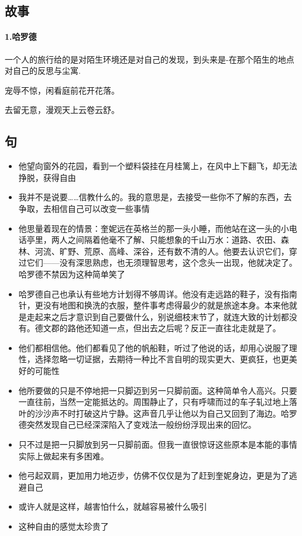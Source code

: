 \documentclass[UTF8,a4paper,8pt]{ctexart}
\begin{document}
 \subsection{故事}  			
 \paragraph{1.哈罗德}一个人的旅行给的是对陌生环境还是对自己的发现，到头来是-在那个陌生的地点对自己的反思与尘寓.
 
 宠辱不惊，闲看庭前花开花落。
 
 去留无意，漫观天上云卷云舒。
 
 \subsection*{句}	
 \begin{itemize}
 	\item 他望向窗外的花园，看到一个塑料袋挂在月桂篱上，在风中上下翻飞，却无法挣脱，获得自由
 	\item 我并不是说要……信教什么的。我的意思是，去接受一些你不了解的东西，去争取，去相信自己可以改变一些事情
 	\item 他思量着现在的情景：奎妮远在英格兰的那一头小睡，而他站在这一头的小电话亭里，两人之间隔着他毫不了解、只能想象的千山万水：道路、农田、森林、河流、旷野、荒原、高峰、深谷，还有数不清的人。他要去认识它们，穿过它们——没有深思熟虑，也无须理智思考，这个念头一出现，他就决定了。哈罗德不禁因为这种简单笑了
 	\item 哈罗德自己也承认有些地方计划得不够周详。他没有走远路的鞋子，没有指南针，更没有地图和换洗的衣服，整件事考虑得最少的就是旅途本身。本来他就是走起来之后才意识到自己要做什么，别说细枝末节了，就连大致的计划都没有。德文郡的路他还知道一点，但出去之后呢？反正一直往北走就是了。
 	\item 他们都相信他。他们都看见了他的帆船鞋，听过了他说的话，却用心说服了理性，选择忽略一切证据，去期待一种比不言自明的现实更大、更疯狂，也更美好的可能性
 	\item 他所要做的只是不停地把一只脚迈到另一只脚前面。这种简单令人高兴。只要一直往前，当然一定能抵达的。周围静止了，只有呼啸而过的车子轧过地上落叶的沙沙声不时打破这片宁静。这声音几乎让他以为自己又回到了海边。哈罗德突然发现自己已经深深陷入了变戏法一般纷纷浮现出来的回忆。
 	\item 只不过是把一只脚放到另一只脚前面。但我一直很惊讶这些原本是本能的事情实际上做起来有多困难。
 	\item 他弓起双肩，更加用力地迈步，仿佛不仅仅是为了赶到奎妮身边，更是为了逃避自己
 	\item 或许人就是这样，越害怕什么，就越容易被什么吸引
 	\item 这种自由的感觉太珍贵了
 	
 \end{itemize}
 
\end{document}
